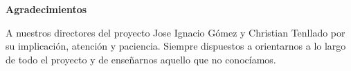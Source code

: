 \newpage
\begin{center}
{\bf \Huge Agradecimientos}
\end{center}
\vspace{1cm}
\setlength{\baselineskip}{0.8cm}

A nuestros directores del proyecto Jose Ignacio Gómez y Christian Tenllado por su implicación, atención y paciencia. Siempre dispuestos a orientarnos a lo largo de todo el proyecto y de enseñarnos aquello que no conocíamos.

